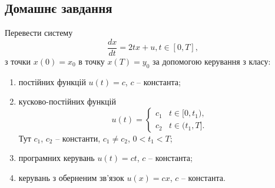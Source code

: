 
\subsection*{Домашнє завдання}

\begin{problem}
    Перевести систему 
    \[ \dfrac{dx}{dt} = 2tx + u, t \in [0, T], \]
    з точки $x(0) = x_0$ в точку $x(T) = y_0$ за допомогою керування з класу:
    \begin{enumerate}
        \item постійних функцій $u(t) = c$, $c$ -- константа; 
        \item кусково-постійних функцій 
        \[
        u(t) = \begin{cases}
            c_1 & t \in [0, t_1), \\
            c_2 & t \in (t_1, T].
        \end{cases}
        \]
        Тут $c_1$, $c_2$ -- константи, $c_1 \ne c_2$, $0 < t_1 < T$;
        \item програмних керувань $u(t) = ct$, $c$ -- константа;
        \item керувань з оберненим зв'язок $u(x) = cx$, $c$ -- константа.
    \end{enumerate}
\end{problem}

